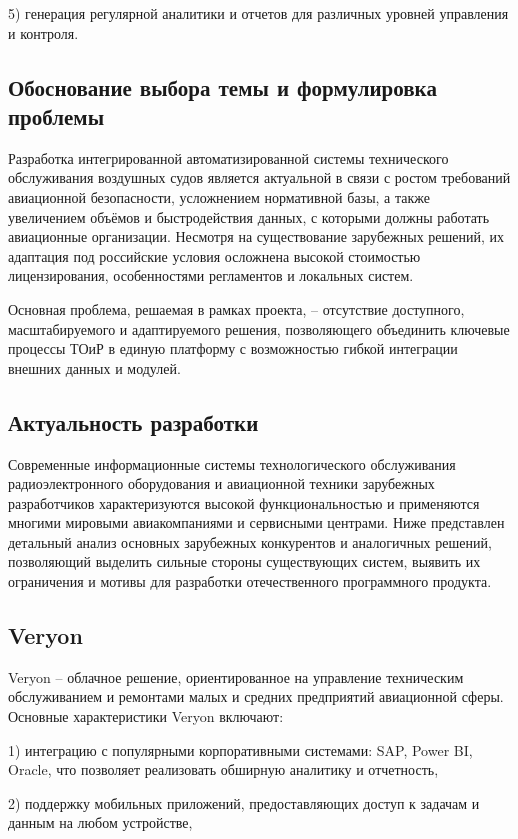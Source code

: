 \documentclass[14pt,a4paper]{extarticle}
\begin{document}
5) генерация регулярной аналитики и отчетов для различных уровней управления и контроля.

\subsection{Обоснование выбора темы и формулировка проблемы}

Разработка интегрированной автоматизированной системы технического обслуживания воздушных судов является актуальной в связи с ростом требований авиационной безопасности, усложнением нормативной базы, а также увеличением объёмов и быстродействия данных, с которыми должны работать авиационные организации. Несмотря на существование зарубежных решений, их адаптация под российские условия осложнена высокой стоимостью лицензирования, особенностями регламентов и локальных систем.

Основная проблема, решаемая в рамках проекта, – отсутствие доступного, масштабируемого и адаптируемого решения, позволяющего объединить ключевые процессы ТОиР в единую платформу с возможностью гибкой интеграции внешних данных и модулей.

\subsection{Актуальность разработки}

Современные информационные системы технологического обслуживания радиоэлектронного оборудования и авиационной техники зарубежных разработчиков характеризуются высокой функциональностью и применяются многими мировыми авиакомпаниями и сервисными центрами. Ниже представлен детальный анализ основных зарубежных конкурентов и аналогичных решений, позволяющий выделить сильные стороны существующих систем, выявить их ограничения и мотивы для разработки отечественного программного продукта.

\subsection{Veryon}

Veryon – облачное решение, ориентированное на управление техническим обслуживанием и ремонтами малых и средних предприятий авиационной сферы. Основные характеристики Veryon включают: 

1) интеграцию с популярными корпоративными системами: SAP, Power BI, Oracle, что позволяет реализовать обширную аналитику и отчетность,

2) поддержку мобильных приложений, предоставляющих доступ к задачам и данным на любом устройстве,
\end{document}
